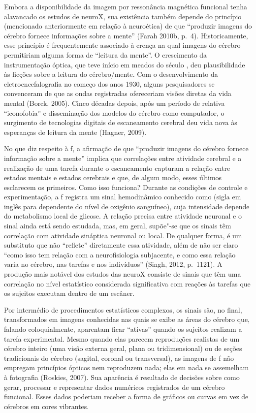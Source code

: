 Embora a disponibilidade da imagem por ressonância magnética funcional
tenha alavancado os estudos de neuroX, sua existência também depende do
princípio (mencionado anteriormente em relação à neuroética) de que
``produzir imagens do cérebro fornece informações sobre a mente'' (Farah
2010b, p.~4). Historicamente, esse princípio é frequentemente associado à
crença na qual imagens do cérebro permitiriam alguma forma de ``leitura
da mente''. O crescimento da instrumentação óptica, que teve início em
meados do século , deu plausibilidade às ficções sobre a leitura do
cérebro/mente. Com o desenvolvimento da eletroencefalografia no começo
dos anos 1930, alguns pesquisadores se convenceram de que as ondas
registradas ofereceriam visões diretas da vida mental (Borck, 2005).
Cinco décadas depois, após um período de relativa ``iconofobia'' e
disseminação dos modelos do cérebro como computador, o surgimento de
tecnologias digitais de escaneamento cerebral deu vida nova às
esperanças de leitura da mente (Hagner, 2009).

No que diz respeito à f, a afirmação de que ``produzir imagens do
cérebro fornece informação sobre a mente'' implica que correlações entre
atividade cerebral e a realização de uma tarefa durante o escaneamento
capturam a relação entre estados mentais e estados cerebrais e que, de
algum modo, esses últimos esclarecem os primeiros. Como isso funciona?
Durante as condições de controle e experimentação, a f registra um
sinal hemodinâmico conhecido como  (sigla em inglês para dependente
do nível de oxigênio sanguíneo), cuja intensidade depende do metabolismo
local de glicose. A relação precisa entre atividade neuronal e o sinal
 ainda está sendo estudada, mas, em geral, supõe"-se que os sinais
têm correlação com atividade sináptica neuronal ou local. De qualquer
forma, é um substituto que não ``reflete'' diretamente essa atividade,
além de não ser claro ``como isso tem relação com a neurofisiologia
subjacente, e como essa relação varia no cérebro, nas tarefas e nos
indivíduos'' (Singh, 2012, p.~1121). A produção mais notável dos estudos
das neuroX consiste de sinais  que têm uma correlação no nível
estatístico considerada significativa com reações às tarefas que os
sujeitos executam dentro de um escâner.

Por intermédio de procedimentos estatísticos complexos, os sinais são,
no final, transformados em imagens conhecidas nas quais se exibe as
áreas do cérebro que, falando coloquialmente, aparentam ficar ``ativas''
quando os sujeitos realizam a tarefa experimental. Mesmo quando elas
parecem reproduções realistas de um cérebro inteiro (uma visão externa
geral, plana ou tridimensional) ou de seções tradicionais do cérebro
(sagital, coronal ou transversal), as imagens de f não empregam
princípios ópticos nem reproduzem nada; elas em nada se assemelham à
fotografia (Roskies, 2007). Sua aparência é resultado de decisões sobre
como gerar, processar e representar dados numéricos registrados de um
cérebro funcional. Esses dados poderiam receber a forma de gráficos ou
curvas em vez de cérebros em cores vibrantes.

